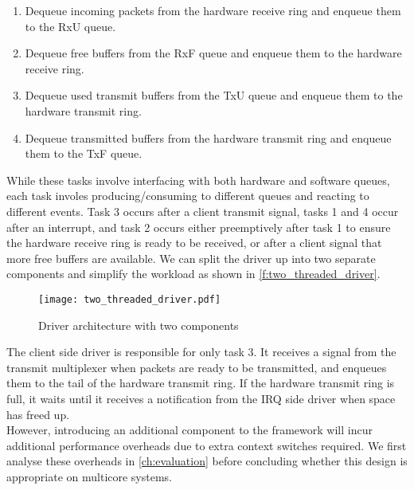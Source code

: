 \begin{enumerate}
    \item Dequeue incoming packets from the hardware receive ring and enqueue them to the RxU queue.
    \item Dequeue free buffers from the RxF queue and enqueue them to the hardware receive ring.
    \item Dequeue used transmit buffers from the TxU queue and enqueue them to the hardware transmit ring.
    \item Dequeue transmitted buffers from the hardware transmit ring and enqueue them to the TxF queue. 
\end{enumerate}

While these tasks involve interfacing with both hardware and software queues, each task involes
producing/consuming to different queues and reacting to different events. Task 3 occurs after a client transmit signal, 
tasks 1 and 4 occur after an interrupt, and task 2 occurs either preemptively after task 1 to ensure the hardware receive
ring is ready to be received, or after a client signal that more free buffers are available. We can split the driver up into
two separate components and simplify the workload as shown in \autoref{f:two_threaded_driver}.

\begin{figure}[h]
    \centering
    \texttt{[image: two\_threaded\_driver.pdf]}
    \caption{Driver architecture with two components}
    \label{f:two_threaded_driver}
\end{figure}

The client side driver is responsible for only task 3. It receives a signal from the transmit multiplexer when packets are ready
to be transmitted, and enqueues them to the tail of the hardware transmit ring. If the hardware transmit ring is full, it waits 
until it receives a notification from the IRQ side driver when space has freed up.\\
However, introducing an additional component to the framework will incur additional performance overheads due to extra context switches required.
We first analyse these overheads in \autoref{ch:evaluation} before concluding whether this design is appropriate on multicore systems. 

